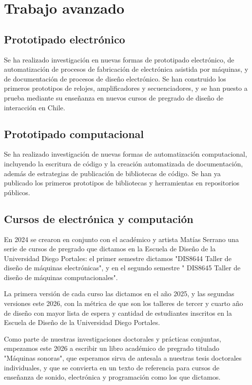 \documentclass[../proyecto.tex]{subfiles}
\begin{document}
\chapter{Trabajo avanzado}


\section{Prototipado electrónico}

Se ha realizado investigación en nuevas formas de prototipado electrónico, de automatización de procesos de fabricación de electrónica asistida por máquinas, y de documentación de procesos de diseño electrónico. Se han construido los primeros prototipos de relojes, amplificadores y secuenciadores, y se han puesto a prueba mediante su enseñanza en nuevos cursos de pregrado de diseño de interacción en Chile.

\section{Prototipado computacional}

Se ha realizado investigación de nuevas formas de automatización computacional, incluyendo la escritura de código y la creación automatizada de documentación, además de estrategias de publicación de bibliotecas de código. Se han ya publicado los primeros prototipos de bibliotecas y herramientas en repositorios públicos.

\section{Cursos de electrónica y computación}

En 2024 se crearon en conjunto con el académico y artista Matías Serrano una serie de cursos de pregrado que dictamos en la Escuela de Diseño de la Universidad Diego Portales: el primer semestre dictamos "DIS8644 Taller de diseño de máquinas electrónicas", y en el segundo semestre " DIS8645 Taller de diseño de máquinas computacionales".

La primera versión de cada curso las dictamos en el año 2025, y las segundas versiones este 2026, con la métrica de que son los talleres de tercer y cuarto año de diseño con mayor lista de espera y cantidad de estudiantes inscritos en la Escuela de Diseño de la Universidad Diego Portales.

Como parte de nuestras investigaciones doctorales y prácticas conjuntas, empezamos este 2026 a escribir un libro académico de pregrado titulado "Máquinas sonoras", que esperamos sirva de antesala a nuestras tesis doctorales individuales, y que se convierta en un texto de referencia para cursos de enseñanza de sonido, electrónica y programación como los que dictamos.
\end{document}
